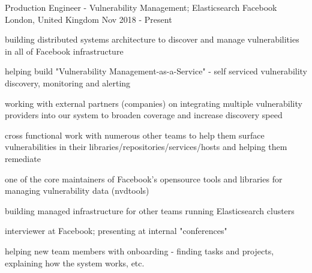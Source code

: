 
\begin{cventries}

  \cventry
    {Production Engineer - Vulnerability Management; Elasticsearch} %
    {Facebook} %
    {London, United Kingdom} %
    {Nov 2018 - Present} %
    {
      \begin{cvitems} %
        \item {building distributed systems architecture to discover and manage vulnerabilities in all of Facebook infrastructure}
        \item {helping build "Vulnerability Management-as-a-Service" - self serviced vulnerability discovery, monitoring and alerting}
        \item {working with external partners (companies) on integrating multiple vulnerability providers into our system to broaden coverage and increase discovery speed}
        \item {cross functional work with numerous other teams to help them surface vulnerabilities in their libraries/repositories/services/hosts and helping them remediate}
        \item {one of the core maintainers of Facebook's opensource tools and libraries for managing vulnerability data (nvdtools)}
        \item {building managed infrastructure for other teams running Elasticsearch clusters}
        \item {interviewer at Facebook; presenting at internal "conferences"}
        \item {helping new team members with onboarding - finding tasks and projects, explaining how the system works, etc.}
      \end{cvitems}
    }


\end{cventries}
